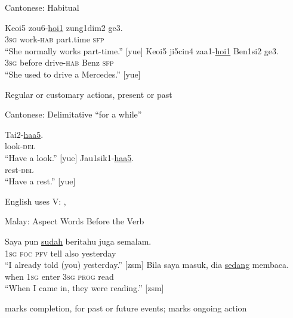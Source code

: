 \documentclass{beamer}
\begin{document}
\begin{frame}{Cantonese: Habitual }
  \begin{exe}
    \ex
    \gll Keoi5 zou6-\ul{hoi1} zung1dim2 ge3. \\
         3\textsc{sg} work-\textsc{hab} part.time \textsc{sfp} \\
    \trans ``She normally works part-time.'' [yue]
    \ex
    \gll Keoi5 ji5cin4 zaa1-\ul{hoi1} Ben1si2 ge3. \\
         3\textsc{sg} before drive-\textsc{hab} Benz \textsc{sfp} \\
    \trans ``She used to drive a Mercedes.'' [yue]
  \end{exe}
  \vfill
  \large
  Regular or customary actions, present or past
\end{frame}

\begin{frame}{Cantonese: Delimitative  ``for a while''}
  \begin{exe}
    \ex
    \gll Tai2-\ul{haa5}. \\
         look-\textsc{del} \\
    \trans ``Have a look.'' [yue]
    \ex
    \gll Jau1sik1-\ul{haa5}. \\
         rest-\textsc{del} \\
    \trans ``Have a rest.'' [yue]
  \end{exe}
  \vfill
  \large
  English uses  V: , 
\end{frame}

\begin{frame}{Malay: Aspect Words Before the Verb}
  \begin{exe}
    \ex
    \gll Saya pun \ul{sudah} beritahu juga semalam. \\
         1\textsc{sg} \textsc{foc} \textsc{pfv} tell also yesterday \\
    \trans ``I already told (you) yesterday.'' [zsm]
    \ex
    \gll Bila saya masuk, dia \ul{sedang} membaca. \\
         when 1\textsc{sg} enter 3\textsc{sg} \textsc{prog} read \\
    \trans ``When I came in, they were reading.'' [zsm]
  \end{exe}
  \vfill
  \large
   marks completion, for past or future events;
   marks ongoing action
\end{frame}
\end{document}
